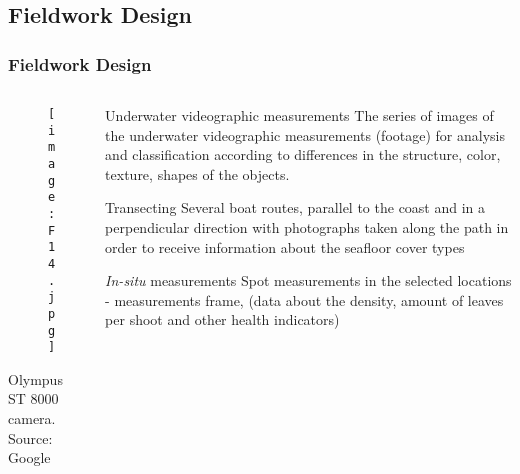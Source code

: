 \documentclass[pdflatex,compress,8pt,
	xcolor={dvipsnames,dvipsnames,svgnames,x11names,table},
	hyperref={colorlinks = true,breaklinks = true, urlcolor = NavyBlue, breaklinks = true}]{beamer}
\begin{document}
\subsection{Fieldwork Design}
\begin{frame}\frametitle{Fieldwork Design}
\begin{minipage}[0.4\textheight]{\textwidth}
\begin{columns}[T]
\begin{column}{0.4\textwidth}
\begin{figure}[H]
	\centering
		\texttt{[image: F14.jpg]}
\end{figure}
\footnotesize{Olympus ST 8000 camera. Source: Google}
\end{column}

\begin{column}{0.6\textwidth}

\begin{alertblock}{Underwater videographic measurements}
The series of images of the underwater videographic measurements (footage) for analysis and classification according to differences in the \alert{structure, color, texture, shapes} of the objects.
\end{alertblock}

\begin{block}{Transecting}
Several boat routes, parallel to the coast and in a perpendicular direction with photographs taken along the path in order to receive information about the seafloor cover types
\end{block}

\begin{examples}{\emph{In-situ} measurements}
Spot measurements in the selected locations - measurements frame, (data about the density, amount of leaves per shoot and other health indicators)
\end{examples}

\end{column}
\end{columns}
\end{minipage}
\end{frame}
\end{document}
